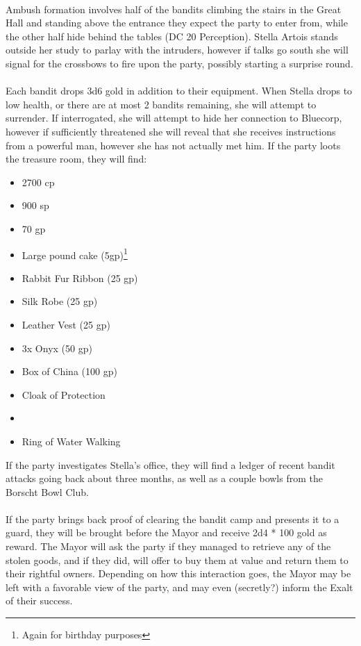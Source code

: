 \\
Ambush formation involves half of the bandits climbing the stairs in the Great Hall and standing above the entrance they expect the party to enter from, while the other half hide behind the tables (DC 20 Perception). Stella Artois stands outside her study to parlay with the intruders, however if talks go south she will signal for the crossbows to fire upon the party, possibly starting a surprise round. \\
\\
Each bandit drops 3d6 gold in addition to their equipment. When Stella drops to low health, or there are at most 2 bandits remaining, she will attempt to surrender. If interrogated, she will attempt to hide her connection to Bluecorp, however if sufficiently threatened she will reveal that she receives instructions from a powerful man, however she has not actually met him. If the party loots the treasure room, they will find:
\begin{itemize}
\item 2700 cp
\item 900 sp
\item 70 gp
\item Large pound cake (5gp)\footnote{Again for birthday purposes}
\item Rabbit Fur Ribbon (25 gp)
\item Silk Robe (25 gp)
\item Leather Vest (25 gp)
\item 3x Onyx (50 gp)
\item Box of China (100 gp)
\item Cloak of Protection
\item {}
\item Ring of Water Walking
\end{itemize}

If the party investigates Stella's office, they will find a ledger of recent bandit attacks going back about three months, as well as a couple bowls from the Borscht Bowl Club.\\
\\
If the party brings back proof of clearing the bandit camp and presents it to a guard, they will be brought before the Mayor and receive 2d4 * 100 gold as reward. The Mayor will ask the party if they managed to retrieve any of the stolen goods, and if they did, will offer to buy them at value and return them to their rightful owners. Depending on how this interaction goes, the Mayor may be left with a favorable view of the party, and may even (secretly?) inform the Exalt of their success.